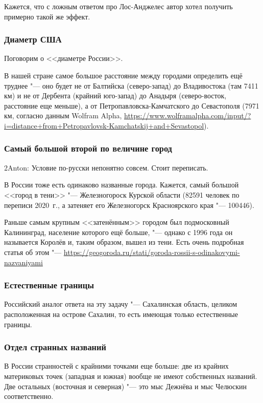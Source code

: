 \documentclass[twoside]{book}
\begin{document}
Кажется, что с ложным ответом про Лос-Анджелес автор хотел получить примерно такой же эффект.


\subsubsection{Диаметр США}
Поговорим о <<диаметре России>>. 

В нашей стране самое большое расстояние между городами определить ещё труднее "--- оно будет не от Балтийска 
(северо-запад) до Владивостока (там 7411 км) и не от Дербента (крайний юго-запад) до Анадыря (северо-восток, 
расстояние еще меньше), а от Петропавловска-Камчатского до Севастополя (7971 км, согласно данным Wolfram Alpha,
\url{https://www.wolframalpha.com/input/?i=distance+from+Petropavlovsk-Kamchatskij+and+Sevastopol}).


\subsubsection{Самый большой второй по величине город}
2Anton: Условие по-русски непонятно совсем. Стоит переписать. 

В России тоже есть одинаково названные города. 
Кажется, самый большой <<город в тени>> "--- Железногороск Курской области (82591 человек по переписи 2020~г., 
а затеняет его Железногорск Красноярского края "--- 100446). 

Раньше самым крупным <<затенённым>> городом был подмосковный Калининград, население которого ещё больше, "---
однако с 1996 года он называется Королёв и, таким образом, вышел из тени.
Есть очень подробная статья об этом "--- \url{https://geogoroda.ru/stati/goroda-rossii-s-odinakovymi-nazvaniyami}

\subsubsection{Естественные границы}
Российский аналог ответа на эту задачу "--- Сахалинская область, целиком расположенная на острове Сахалин,
то есть имеющая только естественные границы.

\subsubsection{Отдел странных названий}
В России странностей с крайними точками еще больше: две из крайних материковых точек (западная и южная) 
вообще не имеют собственных названий. Две остальных (восточная и северная) "--- это мыс Дежнёва и мыс Челюскин
соответственно. 
\end{document}
